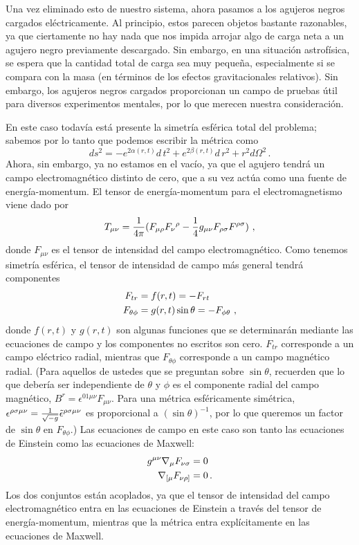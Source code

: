 \documentclass[11pt,b5paper,openany,twoside]{book}
\newcommand{\mn}{{\mu\nu}}
\def\g{{\sqrt{-g}}}
\begin{document}
Una vez eliminado esto de nuestro sistema, ahora pasamos a los agujeros negros cargados eléctricamente.
Al principio, estos parecen objetos bastante razonables, ya que ciertamente no hay nada que nos impida arrojar algo de carga neta a un agujero negro previamente descargado.
Sin embargo, en una situación astrofísica, se espera que la cantidad total de carga sea muy pequeña, especialmente si se compara con la masa (en términos de los efectos gravitacionales relativos).
Sin embargo, los agujeros negros cargados proporcionan un campo de pruebas útil para diversos experimentos mentales, por lo que merecen nuestra consideración.

En este caso todavía está presente la simetría esférica total del problema; sabemos por lo tanto que podemos escribir la métrica como
\begin{equation}
ds^2 = -e^{2\alpha(r,t)} d\,t^2 + e^{2\beta(r,t)} d\,r^2 +
r^2 d\Omega^2\,.\label{7.106}
\end{equation}
Ahora, sin embargo, ya no estamos en el vacío, ya que el agujero tendrá un campo electromagnético distinto de cero, que a su vez actúa como una fuente de energía-momentum.
El tensor de energía-momentum para el electromagnetismo viene dado por
\begin{equation}
T_\mn = {1\over{4\pi}}(F_{\mu\rho}F_\nu{}^\rho
-{1\over 4}g_\mn F_{\rho\sigma}F^{\rho\sigma})\ ,\label{7.107}
\end{equation}
donde $F_\mn$ es el tensor de intensidad del campo electromagnético.
Como tenemos simetría esférica, el tensor de intensidad de campo más general tendrá componentes
\begin{align}
F_{tr}  &=  f(r,t) = -F_{rt} \notag \\
F_{\theta\phi}  &=  g(r,t)\sin\theta = -F_{\phi\theta}\ ,
\label{7.108}
\end{align}
donde $f(r,t)$ y $g(r,t)$ son algunas funciones que se determinarán mediante las ecuaciones de campo y los componentes no escritos son cero.
$F_{tr}$ corresponde a un campo eléctrico radial, mientras que $F_{\theta\phi}$ corresponde a un campo magnético radial.
(Para aquellos de ustedes que se preguntan sobre $\sin\theta$, recuerden que lo que debería ser independiente de $\theta$ y $\phi$ es el componente radial del campo magnético, $B^r = \epsilon^{01\mu\nu}F_{\mu\nu}$.
Para una métrica esféricamente simétrica, $\epsilon^{\rho\sigma\mu\nu}={1\over\g}\tilde\epsilon^{\rho\sigma\mu\nu}$ es proporcional a $(\sin\theta)^{-1}$, por lo que queremos un factor de $\sin\theta$ en $F_{\theta\phi}$.)
Las ecuaciones de campo en este caso son tanto las ecuaciones de Einstein como las ecuaciones de Maxwell:
\begin{align}
g^\mn \nabla_\mu F_{\nu\sigma}  &=  0 \notag \\
\nabla_{[\mu}F_{\nu\rho]}  &=  0\,.\label{7.109}
\end{align}
Los dos conjuntos están acoplados, ya que el tensor de intensidad del campo electromagnético entra en las ecuaciones de Einstein a través del tensor de energía-momentum, mientras que la métrica entra explícitamente en las ecuaciones de Maxwell.
\end{document}
